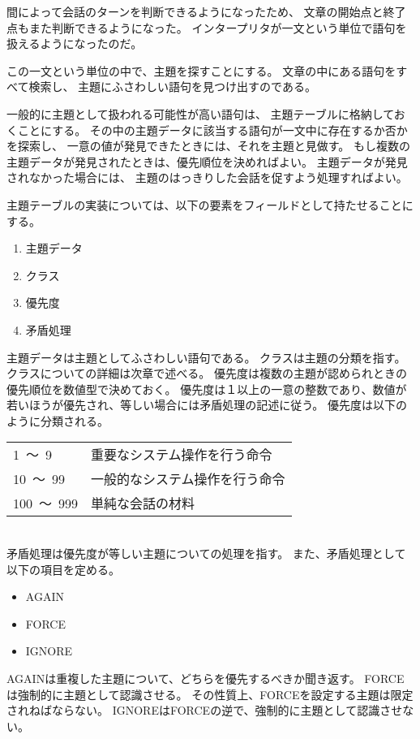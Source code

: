 \documentclass{jsarticle}
\begin{document}
\begin{multicols}{2}
間によって会話のターンを判断できるようになったため、
文章の開始点と終了点もまた判断できるようになった。
インタープリタが一文という単位で語句を扱えるようになったのだ。

この一文という単位の中で、主題を探すことにする。
文章の中にある語句をすべて検索し、
主題にふさわしい語句を見つけ出すのである。

一般的に主題として扱われる可能性が高い語句は、
主題テーブルに格納しておくことにする。
その中の主題データに該当する語句が一文中に存在するか否かを探索し、
一意の値が発見できたときには、それを主題と見做す。
もし複数の主題データが発見されたときは、優先順位を決めればよい。
主題データが発見されなかった場合には、
主題のはっきりした会話を促すよう処理すればよい。

主題テーブルの実装については、以下の要素をフィールドとして持たせることにする。
\begin{enumerate}
\item 主題データ
\item クラス
\item 優先度
\item 矛盾処理
\end{enumerate}
主題データは主題としてふさわしい語句である。
クラスは主題の分類を指す。クラスについての詳細は次章で述べる。
優先度は複数の主題が認められときの優先順位を数値型で決めておく。
優先度は１以上の一意の整数であり、数値が若いほうが優先され、等しい場合には矛盾処理の記述に従う。
優先度は以下のように分類される。
\\ \newline
\begin{tabular}{ll}
1\ ～\ 9 & 重要なシステム操作を行う命令 \\
10\ ～\ 99 & 一般的なシステム操作を行う命令 \\
100\ ～\ 999 & 単純な会話の材料 \\
\end{tabular}
\\ \newline
矛盾処理は優先度が等しい主題についての処理を指す。
また、矛盾処理として以下の項目を定める。
\begin{itemize}
\item AGAIN
\item FORCE
\item IGNORE
\end{itemize}
AGAINは重複した主題について、どちらを優先するべきか聞き返す。
FORCEは強制的に主題として認識させる。
その性質上、FORCEを設定する主題は限定されねばならない。
IGNOREはFORCEの逆で、強制的に主題として認識させない。


\end{multicols}
\end{document}
